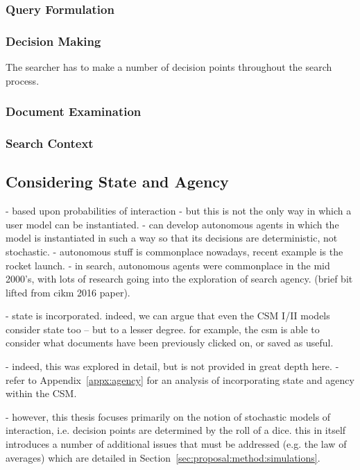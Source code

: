 \subsubsection{Query Formulation}

\subsubsection{Decision Making}
The searcher has to make a number of decision points throughout the search process.

\subsubsection{Document Examination}

\subsubsection{Search Context}

\subsection{Considering State and Agency}
- based upon probabilities of interaction
- but this is not the only way in which a user model can be instantiated.
- can develop autonomous agents in which the model is instantiated in such a way so that its decisions are deterministic, not stochastic.
- autonomous stuff is commonplace nowadays, recent example is the rocket launch.
- in search, autonomous agents were commonplace in the mid 2000's, with lots of research going into the exploration of search agency. (brief bit lifted from cikm 2016 paper).

- state is incorporated. indeed, we can argue that even the CSM I/II models consider state too -- but to a lesser degree. for example, the csm is able to consider what documents have been previously clicked on, or saved as useful.

- indeed, this was explored in detail, but is not provided in great depth here.
- refer to Appendix~\ref{appx:agency} for an analysis of incorporating state and agency within the CSM.

- however, this thesis focuses primarily on the notion of stochastic models of interaction, i.e. decision points are determined by the roll of a dice. this in itself introduces a number of additional issues that must be addressed (e.g. the law of averages) which are detailed in Section~\ref{sec:proposal:method:simulations}.

